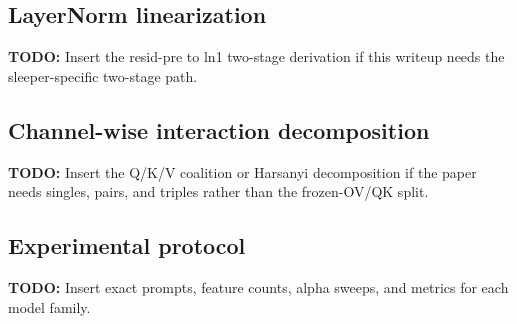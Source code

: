 \documentclass[11pt]{article}
\newcommand{\todo}[1]{\textcolor{red!65!black}{\textbf{TODO:} #1}}
\theoremstyle{definition}
\theoremstyle{plain}
\theoremstyle{remark}
\begin{document}
\subsection{LayerNorm linearization}
\todo{Insert the resid-pre to ln1 two-stage derivation if this writeup needs
the sleeper-specific two-stage path.}

\subsection{Channel-wise interaction decomposition}
\todo{Insert the Q/K/V coalition or Harsanyi decomposition if the paper needs
singles, pairs, and triples rather than the frozen-OV/QK split.}

\subsection{Experimental protocol}
\todo{Insert exact prompts, feature counts, alpha sweeps, and metrics for each
model family.}
\end{document}
